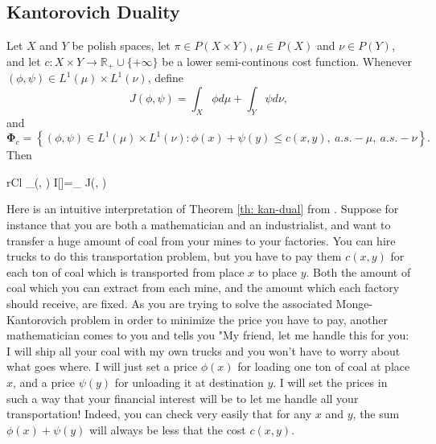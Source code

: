 \subsection{Kantorovich Duality}
\begin{theorem}\label{th: kan-dual}
	Let $X$ and $Y$ be polish spaces, let $\pi \in P(X \times Y)$, $\mu \in P(X)$ and $\nu \in P(Y)$, and let $c: X \times Y \to \mathbb{R}_+\cup\{+\infty\}$ be a lower semi-continous cost function. Whenever $(\phi, \psi) \in L^1(\mu) \times L^1(\nu)$, define 
	\[
	J(\phi, \psi)=\int_{X} \phi d \mu+\int_{Y} \psi d \nu \nonumber,
	\]
	and
	\[
	\boldsymbol{\Phi}_c = \left\{(\phi, \psi) \in L^1(\mu) \times L^1(\nu): \phi(x)+\psi(y) \leq c(x, y), \ a.s.-\mu, \ a.s.-\nu\right\}.
	\]
	Then
	\begin{IEEEeqnarray}{rCl}
		\inf _{\Pi(\mu, \nu)} I[\pi]=\sup _{} J(\phi, \psi) \label{eq: kantDual}
	\end{IEEEeqnarray}
\end{theorem}
\begin{remark}
	Here is an intuitive interpretation of Theorem \ref{th: kan-dual} from \cite{villani2021topics}. Suppose for instance that you are
	both a mathematician and an industrialist, and want to transfer a huge
	amount of coal from your mines to your factories. You can hire trucks to
	do this transportation problem, but you have to pay them $c(x, y)$ for each
	ton of coal which is transported from place $x$ to place $y$. Both the amount
	of coal which you can extract from each mine, and the amount which each
	factory should receive, are fixed. As you are trying to solve the associated
	Monge-Kantorovich problem in order to minimize the price you have to pay,
	another mathematician comes to you and tells you "My friend, let me handle
	this for you: I will ship all your coal with my own trucks and you won't have
	to worry about what goes where. I will just set a price $\phi(x)$ for loading one ton of coal at place $x$, and a price $\psi(y)$ for unloading it at destination $y$. I will set the prices in such a way that your financial interest will be to let me handle all your transportation! Indeed, you can check very easily that for any $x$ and $y$, the sum $\phi(x) + \psi(y)$ will always be less that the cost $c(x, y)$. 
\end{remark}
